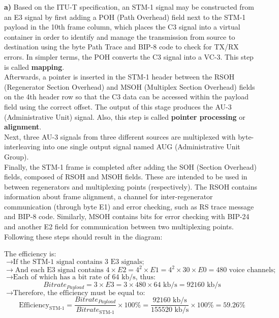 \large\textbf{a)} \normalsize
Based on the ITU-T specification, an STM-1 signal may be constructed from an E3 signal by first adding a POH (Path Overhead) field next to the STM-1 payload in the 10th frame column, which places the C3 signal into a virtual container in order to identify and manage the transmission from source to destination using the byte Path Trace and BIP-8 code to check for TX/RX errors. In simpler terms, the POH converts the C3 signal into a VC-3. This step is called \textbf{mapping}.\\

Afterwards, a pointer is inserted in the STM-1 header between the RSOH (Regenerator Section Overhead) and MSOH (Multiplex Section Overhead) fields on the 4th header row so that the C3 data can be accessed within the payload field using the correct offset. The output of this stage produces the AU-3 (Administrative Unit) signal. Also, this step is called \textbf{pointer processing} or \textbf{alignment}.\\

Next, three AU-3 signals from three different sources are multiplexed with byte-interleaving into one single output signal named AUG (Administrative Unit Group).\\

Finally, the STM-1 frame is completed after adding the SOH (Section Overhead) fields, composed of RSOH and MSOH fields. These are intended to be used in between regenerators and multiplexing points (respectively). The RSOH contains information about frame alignment, a channel for inter-regenerator communication (through byte E1) and error checking, such as RS trace message and BIP-8 code. Similarly, MSOH contains bits for error checking with BIP-24 and another E2 field for communication between two multiplexing points.\\

Following these steps should result in the diagram:

The efficiency is:\\
$\rightarrow\text{If the STM-1 signal contains 3 E3 signals;}$\\
$\rightarrow\text{And each E3 signal contains } 4\times E2 = 4^2\times E1 = 4^2\times 30\times E0 = 480 \text{ voice channels;}$\\
$\rightarrow\text{Each of which has a bit rate of 64 kb/s, thus: }$
$$Bitrate_{Payload} = 3\times E3 = 3\times 480\times 64 \text{ kb/s} = 92160 \text{ kb/s}$$
$\rightarrow\text{Therefore, the efficiency must be equal to:}$
$$\text{Efficiency}_{\text{STM-1}} = \frac{Bitrate_{Payload}}{Bitrate_{\text{STM-1}}}\times 100\% = \frac{92160\text{ kb/s}}{155520 \text{ kb/s}}\times 100\% = \mathbf{59.26}\%$$

